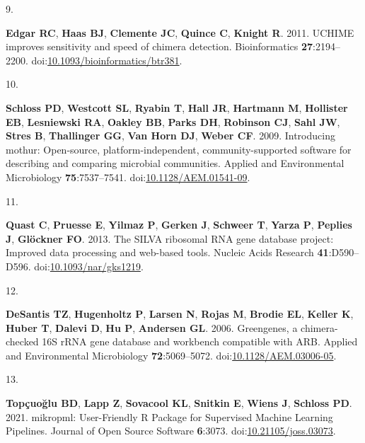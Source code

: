\documentclass[
]{article}
\newlength{\cslhangindent}
\newlength{\csllabelwidth}
\newlength{\cslentryspacingunit} %
\newenvironment{CSLReferences}[2] %
 {%
  \setlength{\parindent}{0pt}
  \ifodd #1
  \let\oldpar\par
  \def\par{\hangindent=\cslhangindent\oldpar}
  \fi
  \setlength{\parskip}{#2\cslentryspacingunit}
 }%
 {}
\newcommand{\CSLLeftMargin}[1]{\parbox[t]{\csllabelwidth}{#1}}
\newcommand{\CSLRightInline}[1]{\parbox[t]{\linewidth - \csllabelwidth}{#1}\break}
\begin{document}
\begin{CSLReferences}{0}{1}
\leavevmode{}%
\CSLLeftMargin{9. }%
\CSLRightInline{\textbf{Edgar RC}, \textbf{Haas BJ}, \textbf{Clemente
JC}, \textbf{Quince C}, \textbf{Knight R}. 2011. UCHIME improves
sensitivity and speed of chimera detection. Bioinformatics
\textbf{27}:2194--2200.
doi:\href{https://doi.org/10.1093/bioinformatics/btr381}{10.1093/bioinformatics/btr381}.}

\leavevmode{}%
\CSLLeftMargin{10. }%
\CSLRightInline{\textbf{Schloss PD}, \textbf{Westcott SL},
\textbf{Ryabin T}, \textbf{Hall JR}, \textbf{Hartmann M},
\textbf{Hollister EB}, \textbf{Lesniewski RA}, \textbf{Oakley BB},
\textbf{Parks DH}, \textbf{Robinson CJ}, \textbf{Sahl JW}, \textbf{Stres
B}, \textbf{Thallinger GG}, \textbf{Van Horn DJ}, \textbf{Weber CF}.
2009. Introducing mothur: Open-source, platform-independent,
community-supported software for describing and comparing microbial
communities. Applied and Environmental Microbiology
\textbf{75}:7537--7541.
doi:\href{https://doi.org/10.1128/AEM.01541-09}{10.1128/AEM.01541-09}.}

\leavevmode{}%
\CSLLeftMargin{11. }%
\CSLRightInline{\textbf{Quast C}, \textbf{Pruesse E}, \textbf{Yilmaz P},
\textbf{Gerken J}, \textbf{Schweer T}, \textbf{Yarza P}, \textbf{Peplies
J}, \textbf{Glöckner FO}. 2013. The SILVA ribosomal RNA gene database
project: Improved data processing and web-based tools. Nucleic Acids
Research \textbf{41}:D590--D596.
doi:\href{https://doi.org/10.1093/nar/gks1219}{10.1093/nar/gks1219}.}

\leavevmode{}%
\CSLLeftMargin{12. }%
\CSLRightInline{\textbf{DeSantis TZ}, \textbf{Hugenholtz P},
\textbf{Larsen N}, \textbf{Rojas M}, \textbf{Brodie EL}, \textbf{Keller
K}, \textbf{Huber T}, \textbf{Dalevi D}, \textbf{Hu P}, \textbf{Andersen
GL}. 2006. Greengenes, a chimera-checked 16S rRNA gene database and
workbench compatible with ARB. Applied and Environmental Microbiology
\textbf{72}:5069--5072.
doi:\href{https://doi.org/10.1128/AEM.03006-05}{10.1128/AEM.03006-05}.}

\leavevmode{}%
\CSLLeftMargin{13. }%
\CSLRightInline{\textbf{Topçuoğlu BD}, \textbf{Lapp Z}, \textbf{Sovacool
KL}, \textbf{Snitkin E}, \textbf{Wiens J}, \textbf{Schloss PD}. 2021.
mikropml: User-Friendly R Package for Supervised Machine Learning
Pipelines. Journal of Open Source Software \textbf{6}:3073.
doi:\href{https://doi.org/10.21105/joss.03073}{10.21105/joss.03073}.}


\end{CSLReferences}
\end{document}
